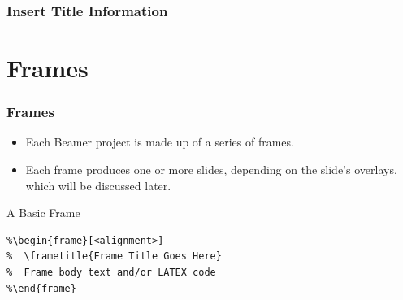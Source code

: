\documentclass[aspectratio=169,utf8]{beamer}
\begin{document}
\begin{frame}
  \frametitle{Insert Title Information}

    
\end{frame}


\section{Frames}

\begin{frame}[fragile]
  \frametitle{Frames}

  \begin{itemize}
    \setlength{\itemsep}{8pt}
    \item Each Beamer project is made up of a series of frames.
    \item Each frame produces one or more slides, depending on the slide's overlays, which will be discussed later.
  \end{itemize}

  \begin{block}{A Basic Frame}
    \begin{verbatim}
%\begin{frame}[<alignment>]
%  \frametitle{Frame Title Goes Here}
%  Frame body text and/or LATEX code
%\end{frame}
    \end{verbatim}
  \end{block}
  
\end{frame}
\end{document}
